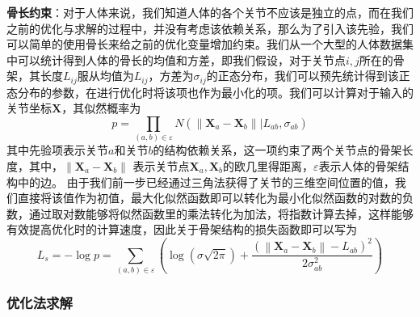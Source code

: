\textbf{骨长约束}：对于人体来说，我们知道人体的各个关节不应该是独立的点，而在我们之前的优化与求解的过程中，并没有考虑该依赖关系，那么为了引入该先验，我们可以简单的使用骨长来给之前的优化变量增加约束。我们从一个大型的人体数据集中可以统计得到人体的骨长的均值和方差，即我们假设，对于关节点\(i,j\)所在的骨架，其长度\(L_{ij}\)服从均值为\(L_{ij}\)，方差为\(\sigma_{ij}\)的正态分布，我们可以预先统计得到该正态分布的参数，在进行优化时将该项也作为最小化的项。我们可以计算对于输入的关节坐标\(\bm{X}\)，其似然概率为
\begin{equation}
    p  = \prod _ { ( a,b ) \in \varepsilon } N \left( \left\| \boldsymbol {X} _ { a } - \boldsymbol {X} _ { b } \right\| | L _ {ab} , \sigma _ {ab} \right)
\end{equation}
其中先验项表示关节\(a\)和关节\(b\)的结构依赖关系，这一项约束了两个关节点的骨架长度，其中，\(\left\| \boldsymbol {X} _ { a } - \boldsymbol {X} _ { b } \right\|\) 表示关节点\(\boldsymbol {X} _ { a }, \boldsymbol {X} _ { b } \)的欧几里得距离，\(\varepsilon\)表示人体的骨架结构中的边。%
由于我们前一步已经通过三角法获得了关节的三维空间位置的值，我们直接将该值作为初值，最大化似然函数即可以转化为最小化似然函数的对数的负数，通过取对数能够将似然函数里的乘法转化为加法，将指数计算去掉，这样能够有效提高优化时的计算速度，因此关于骨架结构的损失函数即可以写为
\begin{equation}
    L_{s} = -\log p = \sum_{ ( a,b ) \in \varepsilon }\left(\log (\sigma \sqrt{2\pi}) + \frac{(\left\| \boldsymbol {X} _ { a } - \boldsymbol {X} _ { b } \right\| - L_{ab})^2}{2\sigma_{ab}^2}\right)
\end{equation}

\subsubsection{优化法求解}

